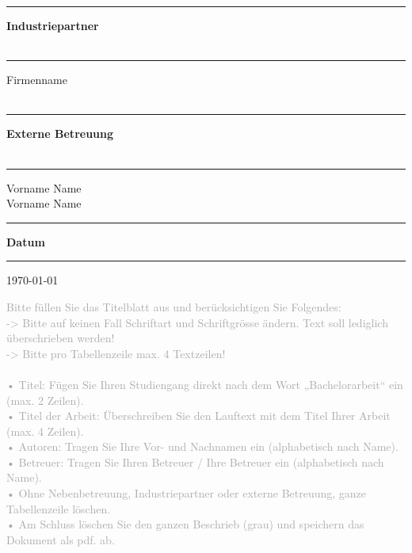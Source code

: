 \begin{titlepage}
\begin{minipage}[b]{0.91\textwidth}
	\begin{minipage}[b]{0.27\textwidth}
	\hrule\vskip 0.5cm
		\textbf{Industriepartner}\\
		\\
	\end{minipage}
	\begin{minipage}[b]{0.03\textwidth}
	\hskip 0.5cm
	\end{minipage}
	\begin{minipage}[b]{0.7\textwidth}
	\hrule\vskip 0.5cm
		Firmenname\\
		\\
	\end{minipage}
	
	\begin{minipage}[b]{0.27\textwidth}
	\hrule\vskip 0.5cm
		\textbf{Externe Betreuung}\\
		\\
	\end{minipage}
	\begin{minipage}[b]{0.03\textwidth}
	\hskip 0.5cm
	\end{minipage}
	\begin{minipage}[b]{0.7\textwidth}
	\hrule\vskip 0.5cm
		Vorname Name\\
		Vorname Name\\
	\end{minipage}
	
	\begin{minipage}[b]{0.27\textwidth}
	\hrule\vskip 0.5cm
		\textbf{Datum}
	\end{minipage}
	\begin{minipage}[b]{0.03\textwidth}
	\hskip 0.5cm
	\end{minipage}
	\begin{minipage}[b]{0.7\textwidth}
	\hrule\vskip 0.5cm
		\today
	\end{minipage}
\end{minipage}
\vskip 0.5cm


\textcolor{darkgray}{
Bitte füllen Sie das Titelblatt aus und berücksichtigen Sie Folgendes:\\
 -> Bitte auf keinen Fall Schriftart und Schriftgrösse ändern. Text soll lediglich überschrieben werden!\\
 -> Bitte pro Tabellenzeile max. 4 Textzeilen!\\
\\
•	Titel: Fügen Sie Ihren Studiengang direkt nach dem Wort „Bachelorarbeit“ ein (max. 2 Zeilen).\\
•	Titel der Arbeit: Überschreiben Sie den Lauftext mit dem Titel Ihrer Arbeit (max. 4 Zeilen).\\
•	Autoren: Tragen Sie Ihre Vor- und Nachnamen ein (alphabetisch nach Name).\\
•	Betreuer: Tragen Sie Ihren Betreuer / Ihre Betreuer ein (alphabetisch nach Name).\\
•	Ohne Nebenbetreuung, Industriepartner oder externe Betreuung, ganze Tabellenzeile löschen.\\
•	Am Schluss löschen Sie den ganzen Beschrieb (grau) und speichern das Dokument als pdf. ab.
}

\end{titlepage}

